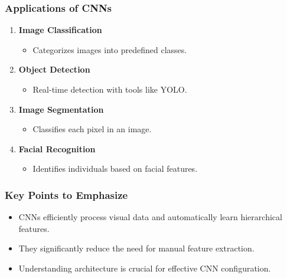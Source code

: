 \documentclass[aspectratio=169]{beamer}
\begin{document}
\begin{frame}[fragile]
    \frametitle{Applications of CNNs}
    \begin{enumerate}
        \item \textbf{Image Classification}
        \begin{itemize}
            \item Categorizes images into predefined classes.
        \end{itemize}
        
        \item \textbf{Object Detection}
        \begin{itemize}
            \item Real-time detection with tools like YOLO.
        \end{itemize}

        \item \textbf{Image Segmentation}
        \begin{itemize}
            \item Classifies each pixel in an image.
        \end{itemize}

        \item \textbf{Facial Recognition}
        \begin{itemize}
            \item Identifies individuals based on facial features.
        \end{itemize}
    \end{enumerate}
\end{frame}

\begin{frame}[fragile]
    \frametitle{Key Points to Emphasize}
    \begin{itemize}
        \item CNNs efficiently process visual data and automatically learn hierarchical features.
        \item They significantly reduce the need for manual feature extraction.
        \item Understanding architecture is crucial for effective CNN configuration.
    \end{itemize}
\end{frame}
\end{document}
